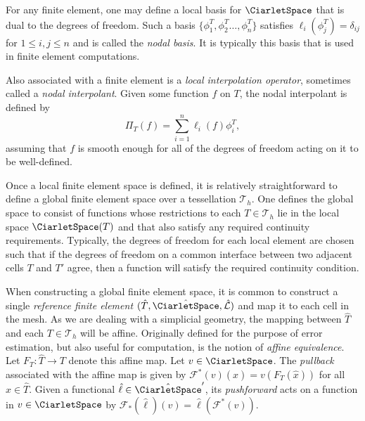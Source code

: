 For any finite element, one may define a local basis for
$\CiarletSpace$ that is dual to the degrees of freedom. Such a basis
$\{\phi^T_1,\phi^T_2 \ldots , \phi^T_{n} \}$ satisfies $ \ell_i(
\phi^T_j ) = \delta_{ij} $ for $1 \leqslant i,j \leqslant n $ and is called
the \emph{nodal basis}. It is typically this basis that is used in
finite element computations.

Also associated with a finite element is a \emph{local interpolation
  operator}, sometimes called a \emph{nodal interpolant}. Given some
function $f$ on $T$, the nodal interpolant is defined by
\begin{equation}
  \Pi_T(f) = \sum_{i=1}^{n} \ell_i(f) \phi^T_i,
\end{equation}
assuming that $f$ is smooth enough for all of the degrees of freedom
acting on it to be well-defined.

Once a local finite element space is defined, it is relatively
straightforward to define a global finite element space over a
tessellation $\mathcal{T}_h$.  One defines the global space to consist
of functions whose restrictions to each $T \in \mathcal{T}_h$ lie in
the local space $\CiarletSpace(T)$ and that also satisfy any required
continuity requirements.  Typically, the degrees of freedom for each
local element are chosen such that if the degrees of freedom on a
common interface between two adjacent cells $T$ and $T'$ agree, then a
function will satisfy the required continuity condition.

When constructing a global finite element space, it is common to
construct a single \emph{reference finite element} $(\hat{T},
\hat{\CiarletSpace}, \hat{\mathcal{L}})$ and map it to each cell in
the mesh. As we are dealing with a simplicial geometry, the mapping
between $\hat{T}$ and each $T \in \mathcal{T}_h$ will be
affine. Originally defined for the purpose of error estimation, but
also useful for computation, is the notion of \emph{affine
  equivalence}. Let $F_T: \hat{T} \rightarrow T$ denote this affine
map. Let $v \in \CiarletSpace$. The \emph{pullback} associated with
the affine map is given by $\mathcal{F}^*(v)(\hat{x}) =
v(F_T(\hat{x}))$ for all $\hat{x} \in \hat{T}$. Given a functional
$\hat{\ell} \in \hat{\CiarletSpace}'$, its \emph{pushforward} acts on
a function in $v \in \CiarletSpace$ by $\mathcal{F}_*(\hat{\ell})(v) =
\hat{\ell}(\mathcal{F}^*(v))$.

